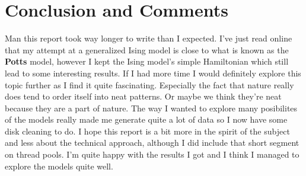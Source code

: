 \documentclass[10pt, titlepage, a4paper]{article}
\begin{document}
\section{Conclusion and Comments}
Man this report took way longer to write than I expected. I've just read online that my attempt at a generalized Ising model is close to what is known 
as the \textbf{Potts} model, however I kept the Ising model's simple Hamiltonian which still lead to some interesting results. If I had more time I would 
definitely explore this topic further as I find it quite fascinating. Especially the fact that nature really does tend to order itself into neat patterns. Or maybe 
we think they're neat because they are a part of nature. The way I wanted to explore many posibilites of the models really made me generate 
quite a lot of data so I now have some disk cleaning to do. I hope this report is a bit more in the spirit of the subject and less about the technical approach, although I did include that 
short segment on thread pools. I'm quite happy with the results I got and I think I managed to explore the models quite well. 


\newpage



\end{document}
